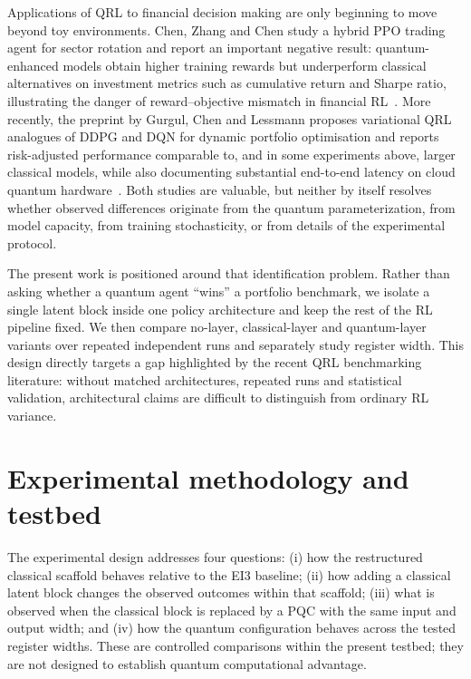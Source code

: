 \documentclass[aps,floatfix,superscriptaddress,twocolumn,tightenlines,amsmath,amssymb,nofootinbib,10pt,longbibliography,prl]{revtex4-2}
\begin{document}
Applications of QRL to financial decision making are only beginning to move beyond toy
environments. Chen, Zhang and Chen study a hybrid PPO trading agent for sector rotation and
report an important negative result: quantum-enhanced models obtain higher training rewards
but underperform classical alternatives on investment metrics such as cumulative return and
Sharpe ratio, illustrating the danger of reward--objective mismatch in financial
RL~\cite{chen2025quantumreinforcementlearningtrading}. More recently, the preprint by
Gurgul, Chen and Lessmann proposes variational QRL analogues of DDPG and DQN for dynamic
portfolio optimisation and reports risk-adjusted performance comparable to, and in some
experiments above, larger classical models, while also documenting substantial end-to-end
latency on cloud quantum hardware~\cite{Gurgul2026QRLPortfolio}. Both studies are valuable,
but neither by itself resolves whether observed differences originate from the quantum
parameterization, from model capacity, from training stochasticity, or from details of the
experimental protocol.

The present work is positioned around that identification problem. Rather than asking
whether a quantum agent ``wins'' a portfolio benchmark, we isolate a single latent block
inside one policy architecture and keep the rest of the RL pipeline fixed. We then compare
no-layer, classical-layer and quantum-layer variants over repeated independent runs and
separately study register width. This design directly targets a gap highlighted by the
recent QRL benchmarking literature: without matched architectures, repeated runs and
statistical validation, architectural claims are difficult to distinguish from ordinary RL
variance.

\section{Experimental methodology and testbed}
\label{sec:testbed}

The experimental design addresses four questions: (i) how the restructured classical
scaffold behaves relative to the EI3 baseline; (ii) how adding a classical latent block
changes the observed outcomes within that scaffold; (iii) what is observed when the
classical block is replaced by a PQC with the same input and output width; and (iv) how the
quantum configuration behaves across the tested register widths. These are controlled
comparisons within the present testbed; they are not designed to establish quantum
computational advantage.
\end{document}

